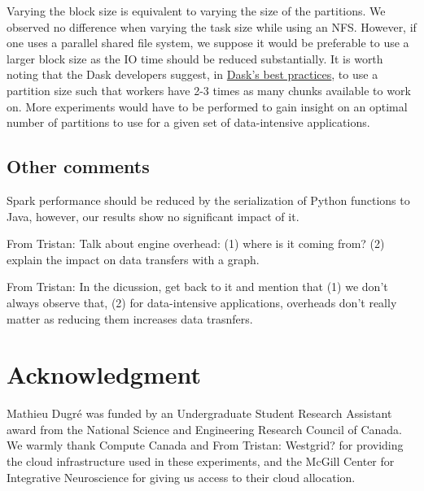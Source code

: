 \documentclass[conference]{IEEEtran}
\newcommand{\TG}[1]{\color{cyan}From Tristan: #1 \color{black}}
\begin{document}
Varying the block size is equivalent to varying the size of the partitions. We
observed no difference when varying the task size while using an NFS. However, if
one uses a parallel shared file system, we suppose it would be preferable to use a
larger block size as the IO time should be reduced substantially. It is worth noting
that the Dask developers suggest, in
\href{https://docs.dask.org/en/latest/best-practices.html}{Dask's best practices}, to
use a partition size such that workers have 2-3 times as many chunks available to
work on. More experiments would have to be performed to gain insight on an optimal
number of partitions to use for a given set of data-intensive applications.

\subsection{Other comments}
Spark performance should be reduced by the serialization of Python functions to Java,
however, our results show no significant impact of it. 


\TG{Talk about engine overhead: (1) where is it coming from? (2) 
explain the impact on data transfers with a graph.}

\TG{In the dicussion, get back to it and mention that (1) we don't
always observe that, (2) for data-intensive applications, overheads don't really matter
as reducing them increases data trasnfers.}

\section*{Acknowledgment}

Mathieu Dugr\'e was funded by an Undergraduate Student Research Assistant award from
the National Science and Engineering Research Council of Canada. We warmly thank
Compute Canada and \TG{Westgrid?} for providing the cloud infrastructure used in
these experiments, and the McGill Center for Integrative Neuroscience for giving us
access to their cloud allocation.



\end{document}
